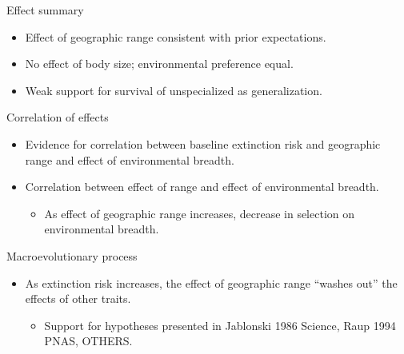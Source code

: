 \documentclass{beamer}
\begin{document}
\begin{frame}
  \begin{block}{Effect summary}
    \begin{itemize}
      \item Effect of geographic range consistent with prior expectations.
      \item No effect of body size; environmental preference equal.
      \item Weak support for survival of unspecialized as generalization.
    \end{itemize}
  \end{block}
\end{frame}

\begin{frame}
  \begin{block}{Correlation of effects}
    \begin{itemize}
      \item Evidence for correlation between baseline extinction risk and geographic range and effect of environmental breadth.
      \item Correlation between effect of range and effect of environmental breadth.
        \begin{itemize}
          \item As effect of geographic range increases, decrease in selection on environmental breadth.
        \end{itemize}
    \end{itemize}
  \end{block}
\end{frame}

\begin{frame}
  \begin{alertblock}{Macroevolutionary process}
    \begin{itemize}
      \item As extinction risk increases, the effect of geographic range ``washes out'' the effects of other traits.
        \begin{itemize}
          \item Support for hypotheses presented in Jablonski 1986 Science, Raup 1994 PNAS, OTHERS.
        \end{itemize}
    \end{itemize}
  \end{alertblock}
\end{frame}
\end{document}
